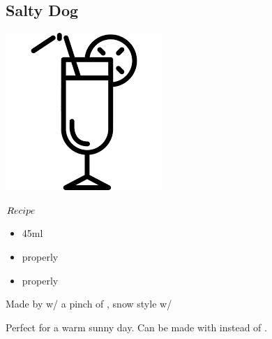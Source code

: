 \subsection{Salty Dog}
\vspace{-7.4mm}
\hspace{32mm}
\includegraphics[scale=.07]{cocktail_glass_tall.png}
\vspace{2.5mm}
\begin{itembox}[l]{\boldmath $Recipe$}
\begin{itemize}
\setlength{\parskip}{0cm}
\setlength{\itemsep}{0cm}
\item \vodka 45ml
\item \gj properly
\item \salt properly
\end{itemize}
\vspace{-4mm}
Made by \build w/ a pinch of \salt, snow style w/ \salt
\hspace{-1mm}
\end{itembox}
Perfect for a warm sunny day. Can be made with \gin instead of \vodka
\hspace{-1mm}.
